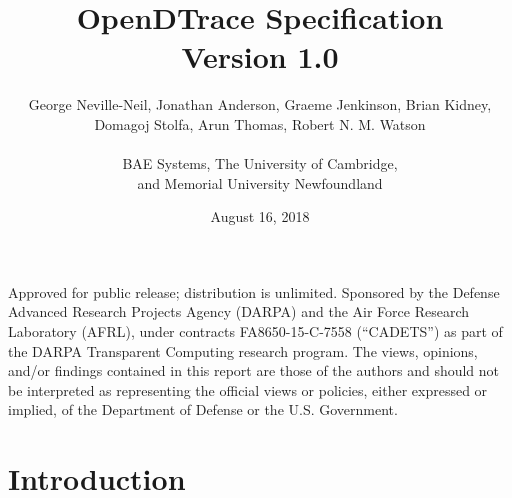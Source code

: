 


\title{OpenDTrace Specification\\
  {\large Version 1.0}
}

\date{August 16, 2018}

\author{
  George Neville-Neil, Jonathan Anderson, Graeme Jenkinson, Brian Kidney, \\
  Domagoj Stolfa,  Arun Thomas, Robert N. M. Watson \\
  \\
  BAE Systems, The University of Cambridge, \\
  and Memorial University Newfoundland }

\begin{minipage}[h]{\textwidth}
  \maketitle

  \vspace{2in}
  {\small
  Approved for public release; distribution is unlimited.
  Sponsored by the Defense Advanced Research Projects Agency (DARPA) and the
  Air Force Research Laboratory (AFRL), under contracts FA8650-15-C-7558
  (``CADETS'') as part of the DARPA Transparent Computing research program.
  The views, opinions, and/or findings contained in this report are those of the
  authors and should not be interpreted as representing the official views or
  policies, either expressed or implied, of the Department of Defense
  or the U.S. Government.}
\end{minipage}

\normalsize



\clearpage



\clearpage



\clearpage

\tableofcontents

\clearpage

\chapter{Introduction}
\label{chap:introduction}


